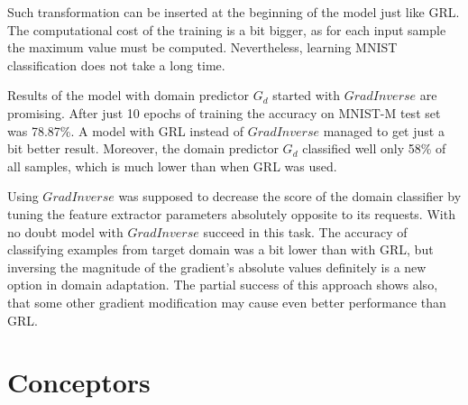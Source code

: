 \documentclass{article}
\begin{document}
Such transformation can be inserted at the beginning of the model just like GRL. The computational cost of the training is a bit bigger, as for each input sample the maximum value must be computed. Nevertheless, learning MNIST classification does not take a long time.
\par
Results of the model with domain predictor $G_{d}$ started with $GradInverse$ are promising. 
After just 10 epochs of training the accuracy on MNIST-M test set was 78.87\%. A model with GRL instead of $GradInverse$ managed to get just a bit better result. Moreover, the domain predictor $G_{d}$ classified well only 58\% of all samples, which is much lower than when GRL was used.
\par
Using $GradInverse$ was supposed to decrease the score of the domain classifier by tuning the feature extractor parameters absolutely opposite to its requests. With no doubt model with $GradInverse$ succeed in this task. The accuracy of classifying examples from target domain was a bit lower than with GRL, but inversing the magnitude of the gradient's absolute values definitely is a new option in domain adaptation. The partial success of this approach shows also, that some other gradient modification may cause even better performance than GRL.

\section{Conceptors}
\end{document}
